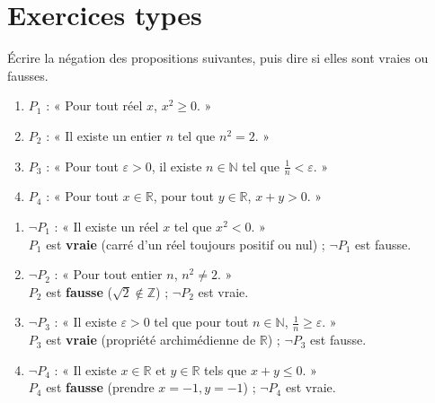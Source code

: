 \documentclass[11pt,a4paper,twoside]{book}
\newcommand{\N}{\mathbb{N}}
\newcommand{\Z}{\mathbb{Z}}
\newcommand{\R}{\mathbb{R}}
\newcommand{\eps}{\varepsilon}
\begin{document}
\section{Exercices types}

\begin{exercicebox}
Écrire la négation des propositions suivantes, puis dire si elles sont vraies ou fausses.
\begin{enumerate}
  \item $P_1$ : « Pour tout réel $x$, $x^2 \geq 0$. »
  \item $P_2$ : « Il existe un entier $n$ tel que $n^2 = 2$. »
  \item $P_3$ : « Pour tout $\eps > 0$, il existe $n \in \N$ tel que $\frac{1}{n} < \eps$. »
  \item $P_4$ : « Pour tout $x \in \R$, pour tout $y \in \R$, $x + y > 0$. »
\end{enumerate}
\end{exercicebox}

\begin{correctionbox}
\begin{enumerate}
  \item $\neg P_1$ : « Il existe un réel $x$ tel que $x^2 < 0$. »\\
        $P_1$ est \textbf{vraie} (carré d'un réel toujours positif ou nul) ;
        $\neg P_1$ est fausse.

  \item $\neg P_2$ : « Pour tout entier $n$, $n^2 \neq 2$. »\\
        $P_2$ est \textbf{fausse} ($\sqrt{2} \notin \Z$) ; $\neg P_2$ est vraie.

  \item $\neg P_3$ : « Il existe $\eps > 0$ tel que pour tout $n \in \N$,
        $\frac{1}{n} \geq \eps$. »\\
        $P_3$ est \textbf{vraie} (propriété archimédienne de $\R$) ;
        $\neg P_3$ est fausse.

  \item $\neg P_4$ : « Il existe $x \in \R$ et $y \in \R$ tels que $x + y \leq 0$. »\\
        $P_4$ est \textbf{fausse} (prendre $x = -1, y = -1$) ; $\neg P_4$ est vraie.
\end{enumerate}
\end{correctionbox}
\end{document}
